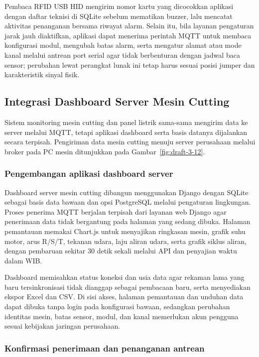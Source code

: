 Pembaca RFID USB HID mengirim nomor kartu yang dicocokkan aplikasi dengan daftar teknisi di SQLite sebelum mematikan buzzer, lalu mencatat aktivitas penanganan bersama riwayat alarm. Selain itu, bila layanan pengaturan jarak jauh diaktifkan, aplikasi dapat menerima perintah MQTT untuk membaca konfigurasi modul, mengubah batas alarm, serta mengatur alamat atau mode kanal melalui antrean port serial agar tidak berbenturan dengan jadwal baca sensor; perubahan lewat perangkat lunak ini tetap harus sesuai posisi jumper dan karakteristik sinyal fisik.

\subsection{Integrasi Dashboard Server Mesin Cutting}

Sistem monitoring mesin cutting dan panel listrik sama-sama mengirim data ke server melalui MQTT, tetapi aplikasi dashboard serta basis datanya dijalankan secara terpisah. Pengiriman data mesin cutting menuju server perusahaan melalui broker pada PC mesin ditunjukkan pada Gambar~\ref{fig:draft-3-12}.



\subsubsection{Pengembangan aplikasi dashboard server}

Dashboard server mesin cutting dibangun menggunakan Django dengan SQLite sebagai basis data bawaan dan opsi PostgreSQL melalui pengaturan lingkungan. Proses penerima MQTT berjalan terpisah dari layanan web Django agar penerimaan data tidak bergantung pada halaman yang sedang dibuka. Halaman pemantauan memakai Chart.js untuk menyajikan ringkasan mesin, grafik suhu motor, arus R/S/T, tekanan udara, laju aliran udara, serta grafik siklus aliran, dengan pembaruan sekitar 30 detik sekali melalui API dan penyajian waktu dalam WIB.

Dashboard memisahkan status koneksi dan usia data agar rekaman lama yang baru tersinkronisasi tidak dianggap sebagai pembacaan baru, serta menyediakan ekspor Excel dan CSV. Di sisi akses, halaman pemantauan dan unduhan data dapat dibuka tanpa login pada konfigurasi bawaan, sedangkan perubahan identitas mesin, batas sensor, modul, dan kanal memerlukan akun pengguna sesuai kebijakan jaringan perusahaan.

\subsubsection{Konfirmasi penerimaan dan penanganan antrean}

